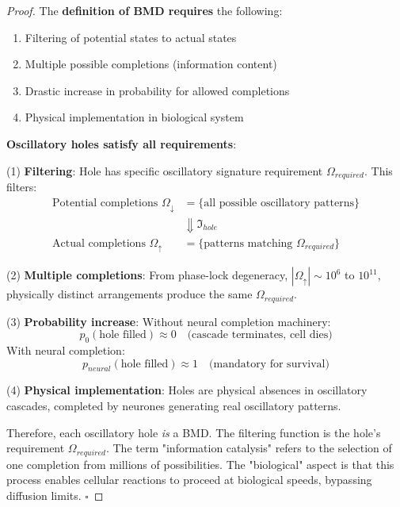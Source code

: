 \documentclass[11pt,a4paper]{article}
\begin{document}
\begin{proof}
The \textbf{ definition of BMD requires} the following:
\begin{enumerate}
\item Filtering of potential states to actual states
\item Multiple possible completions (information content)
\item Drastic increase in probability for allowed completions
\item Physical implementation in biological system
\end{enumerate}

\textbf{Oscillatory holes satisfy all requirements}:

(1) \textbf{Filtering}: Hole has specific oscillatory signature requirement $\Omega_{required}$. This filters:
\begin{align}
\text{Potential completions } \Omega_{\downarrow} &= \{\text{all possible oscillatory patterns}\} \\
&\Downarrow \Im_{hole} \\
\text{Actual completions } \Omega_{\uparrow} &= \{\text{patterns matching } \Omega_{required}\}
\end{align}

(2) \textbf{Multiple completions}: From phase-lock degeneracy, $|\Omega_{\uparrow}| \sim 10^6$ to $10^{11}$, physically distinct arrangements produce the same $\Omega_{required}$.

(3) \textbf{Probability increase}: Without neural completion machinery:
\begin{equation}
p_0(\text{hole filled}) \approx 0 \quad \text{(cascade terminates, cell dies)}
\end{equation}
With neural completion:
\begin{equation}
p_{neural}(\text{hole filled}) \approx 1 \quad \text{(mandatory for survival)}
\end{equation}

(4) \textbf{Physical implementation}: Holes are physical absences in oscillatory cascades, completed by neurones generating real oscillatory patterns.

Therefore, each oscillatory hole \textit{is} a BMD. The filtering function is the hole's requirement $\Omega_{required}$. The term "information catalysis" refers to the selection of one completion from millions of possibilities. The "biological" aspect is that this process enables cellular reactions to proceed at biological speeds, bypassing diffusion limits.
$\square$
\end{proof}
\end{document}
